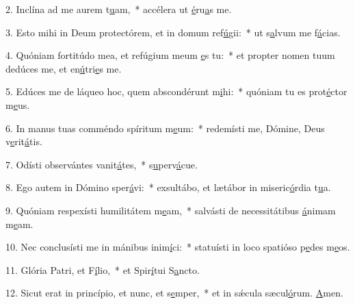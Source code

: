 2. Inclína ad me aurem t\uline{u}am,~* accélera ut \uline{é}ru\uline{a}s me.\par 
3. Esto mihi in Deum protectórem, et in domum ref\uline{ú}gii:~* ut s\uline{a}lvum me f\uline{á}cias.\par 
4. Quóniam fortitúdo mea, et refúgium meum \uline{e}s tu:~* et propter nomen tuum dedúces me, et en\uline{ú}tri\uline{e}s me.\par 
5. Edúces me de láqueo hoc, quem abscondérunt m\uline{i}hi:~* quóniam tu es prot\uline{é}ctor m\uline{e}us.\par 
6. In manus tuas comméndo spíritum m\uline{e}um:~* redemísti me, Dómine, Deus v\uline{e}rit\uline{á}tis.\par 
7. Odísti observántes vanit\uline{á}tes,~* s\uline{u}perv\uline{á}cue.\par 
8. Ego autem in Dómino sper\uline{á}vi:~* exsultábo, et lætábor in miseric\uline{ó}rdia t\uline{u}a.\par 
9. Quóniam respexísti humilitátem m\uline{e}am,~* salvásti de necessitátibus \uline{á}nimam m\uline{e}am.\par 
10. Nec conclusísti me in mánibus inim\uline{í}ci:~* statuísti in loco spatióso p\uline{e}des m\uline{e}os.\par 
11. Glória Patri, et F\uline{í}lio,~* et Spir\uline{í}tui S\uline{a}ncto.\par 
12. Sicut erat in princípio, et nunc, et s\uline{e}mper,~* et in sǽcula sæcul\uline{ó}rum. \uline{A}men.\par 
